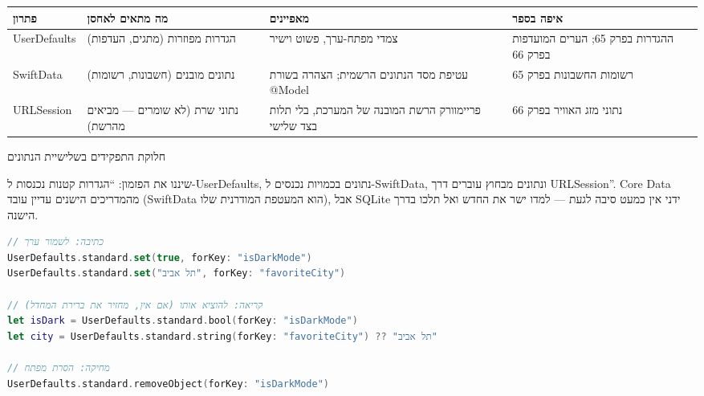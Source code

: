 


\begin{center}
\begin{tabularx}{\linewidth}{|X|X|X|X|}
\hline
\textbf{פתרון} & \textbf{מה מתאים לאחסן} & \textbf{מאפיינים} & \textbf{איפה בספר} \tabularnewline
\hline
UserDefaults & הגדרות מפוזרות (מתגים, העדפות) & צמדי מפתח-ערך, פשוט וישיר & ההגדרות בפרק 65; הערים המועדפות בפרק 66 \tabularnewline
SwiftData & נתונים מובנים (חשבונות, רשומות) & עטיפת מסד הנתונים הרשמית; הצהרה בשורת @Model & רשומות החשבונות בפרק 65 \tabularnewline
URLSession & נתוני שרת (לא שומרים — מביאים מהרשת) & פריימוורק הרשת המובנה של המערכת, בלי תלות בצד שלישי & נתוני מזג האוויר בפרק 66 \tabularnewline
\hline
\end{tabularx}
\end{center}

\begin{center}\small\color{gray}חלוקת התפקידים בשלישיית הנתונים\end{center}

שיננו את הפזמון: “הגדרות קטנות נכנסות ל-UserDefaults, נתונים בכמויות נכנסים ל-SwiftData, ונתונים מבחוץ עוברים דרך URLSession”. Core Data מהמדריכים הישנים עדיין עובד (SwiftData הוא המעטפת המודרנית שלו), אבל SQLite ידני אין כמעט סיבה לגעת — למדו ישר את החדש ואל תלכו בדרך הישנה.


\begin{lstlisting}[language=Swift]
// כתיבה: לשמור ערך
UserDefaults.standard.set(true, forKey: "isDarkMode")
UserDefaults.standard.set("תל אביב", forKey: "favoriteCity")

// קריאה: להוציא אותו (אם אין, מחזיר את ברירת המחדל)
let isDark = UserDefaults.standard.bool(forKey: "isDarkMode")
let city = UserDefaults.standard.string(forKey: "favoriteCity") ?? "תל אביב"

// מחיקה: הסרת מפתח
UserDefaults.standard.removeObject(forKey: "isDarkMode")
\end{lstlisting}

